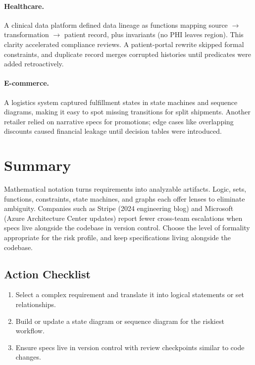 \paragraph{Healthcare.} A clinical data platform defined data lineage as functions mapping source $\rightarrow$ transformation $\rightarrow$ patient record, plus invariants (no PHI leaves region). This clarity accelerated compliance reviews. A patient-portal rewrite skipped formal constraints, and duplicate record merges corrupted histories until predicates were added retroactively.

\paragraph{E-commerce.} A logistics system captured fulfillment states in state machines and sequence diagrams, making it easy to spot missing transitions for split shipments. Another retailer relied on narrative specs for promotions; edge cases like overlapping discounts caused financial leakage until decision tables were introduced.

\section{Summary}
\label{sec:req-spec-summary}

Mathematical notation turns requirements into analyzable artifacts. Logic, sets, functions, constraints, state machines, and graphs each offer lenses to eliminate ambiguity. Companies such as Stripe (2024 engineering blog) and Microsoft (Azure Architecture Center updates) report fewer cross-team escalations when specs live alongside the codebase in version control. Choose the level of formality appropriate for the risk profile, and keep specifications living alongside the codebase.

\subsection{Action Checklist}
\begin{enumerate}
    \item Select a complex requirement and translate it into logical statements or set relationships.
    \item Build or update a state diagram or sequence diagram for the riskiest workflow.
    \item Ensure specs live in version control with review checkpoints similar to code changes.
\end{enumerate}

